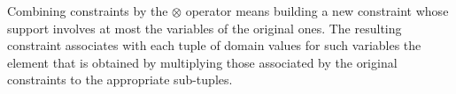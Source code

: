 \documentclass{llncs}
\def\monop{\otimes}
\def\odiv{\, {\ominus\hspace{-7.7pt} \div} \,}
\begin{document}
Combining constraints by the $\monop$ operator
means building a new constraint whose support involves at most
the variables of the original ones. The resulting constraint  associates with
each tuple of domain values for such variables the element
that is obtained by multiplying  those associated by the
original constraints to the appropriate sub-tuples.
%

%
%
%
%

\end{document}
